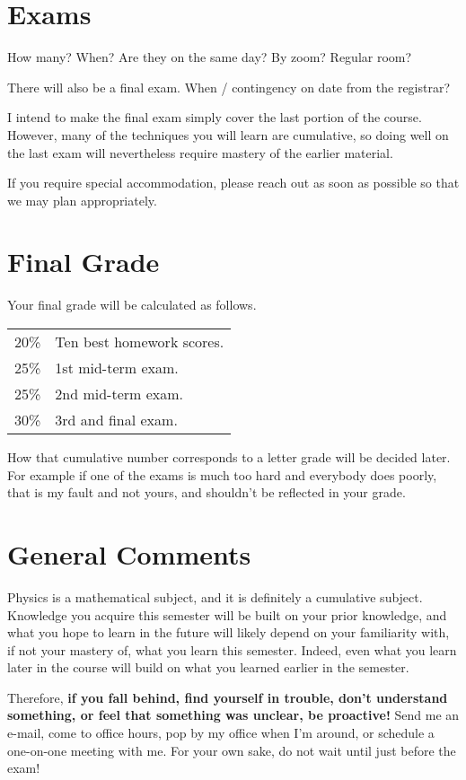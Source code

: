 \section*{Exams}

How many?  When?  Are they on the same day?  By zoom?  Regular room?

There will also be a final exam.  When / contingency on date from the registrar?

I intend to make the final exam simply cover the last portion of the course.  However, many of the techniques you will learn are cumulative, so doing well on the last exam will nevertheless require mastery of the earlier material.

If you require special accommodation, please reach out as soon as possible so that we may plan appropriately.

\section*{Final Grade}

Your final grade will be calculated as follows.

\begin{center}
\begin{tabular}{cl}
	20\%	&	Ten best homework scores. \\
	25\%	&	1st mid-term exam. \\
	25\%	&	2nd mid-term exam. \\
	30\%	&	3rd and final exam.
\end{tabular}
\end{center}

How that cumulative number corresponds to a letter grade will be decided later.  For example if one of the exams is much too hard and everybody does poorly, that is my fault and not yours, and shouldn't be reflected in your grade.

\section*{General Comments}

Physics is a mathematical subject, and it is definitely a cumulative subject.
Knowledge you acquire this semester will be built on your prior knowledge, and what you hope to learn in the future will likely depend on your familiarity with, if not your mastery of, what you learn this semester.
Indeed, even what you learn later in the course will build on what you learned earlier in the semester.

Therefore, {\bf if you fall behind, find yourself in trouble, don't understand something, or feel that something was unclear, be proactive!}
Send me an e-mail, come to office hours, pop by my office when I'm around, or schedule a one-on-one meeting with me.
For your own sake, do not wait until just before the exam!




